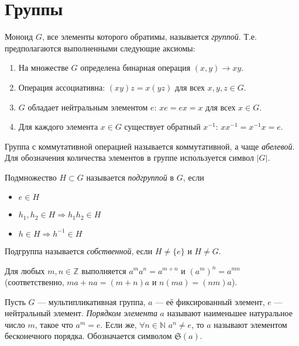 \section{Группы}

\begin{definition}
    Моноид $G$, все элементы которого обратимы, называется \textit{группой}. Т.е. предполагаются выполненными следующие аксиомы:
    \begin{enumerate}
        \item На множестве $G$ определена бинарная операция $(x,y)\to xy$.
        \item Операция ассоциативна: $(xy)z=x(yz)$ для всех $x,y,z\in G$.
        \item $G$ обладает нейтральным элементом $e$: $xe=ex=x$ для всех $x\in G$.
        \item Для каждого элемента $x\in G$ существует обратный $x^{-1}$: $xx^{-1}=x^{-1}x=e$.
    \end{enumerate}
\end{definition}

Группа с коммутативной операцией называется коммутативной, а чаще \textit{абелевой}. Для обозначения количества элементов в группе используется символ $|G|$.

\begin{definition}
    Подмножество $H\subset G$ называется \textit{подгруппой} в $G$, если
    \begin{itemize}
        \item $e\in H$
        \item $h_1,h_2\in H \Rightarrow h_1h_2\in H$
        \item $h\in H \Rightarrow h^{-1}\in H$
    \end{itemize}
    Подгруппа называется \textit{собственной}, если $H\ne \{e\}$ и $H\ne G$.
\end{definition}

\begin{theorem}
    Для любых $m,n \in \mathbb{Z}$ выполняется $a^ma^n=a^{m+n}$ и $(a^m)^n=a^{mn}$ (соответственно, $ma+na=(m+n)a$ и $n(ma)=(nm)a$).
\end{theorem}

\begin{definition}
    Пусть $G$ --- мультипликативная группа, $a$ --- её фиксированный элемент, $e$ --- нейтральный элемент. \textit{Порядком элемента} $a$ называют наименьшее натуральное число $m$, такое что $a^m = e$. Если же, $\forall n \in \mathbb{N}$ $a^n \ne e$, то $a$ называют элементом бесконечного порядка. Обозначается символом $\mathfrak{S}(a)$.
\end{definition}

